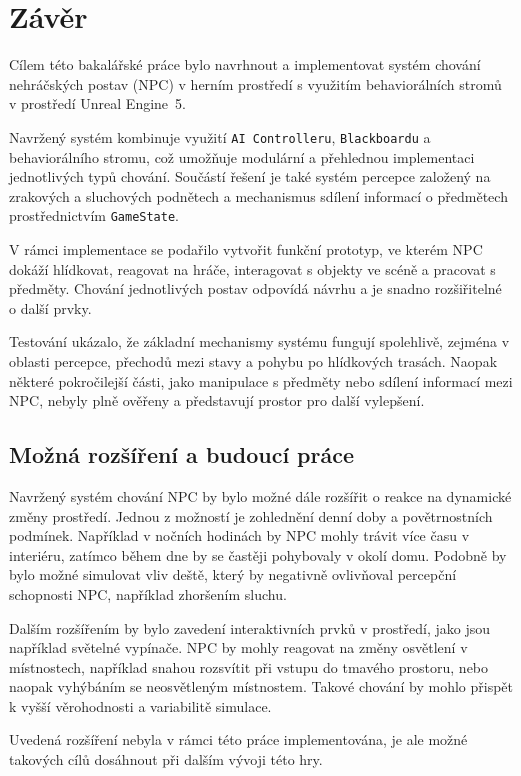 \chapter{Závěr}
\label{sec:conclusion}

Cílem této bakalářské práce bylo navrhnout a implementovat systém
chování nehráčských postav (NPC) v herním prostředí s využitím
behaviorálních stromů v prostředí Unreal Engine~5.

Navržený systém kombinuje využití \texttt{AI Controlleru}, \texttt{Blackboardu} a behaviorálního stromu, což umožňuje
modulární a přehlednou implementaci jednotlivých typů chování.
Součástí řešení je také systém percepce založený na zrakových a sluchových podnětech a mechanismus sdílení informací o předmětech 
prostřednictvím \texttt{GameState}.

V rámci implementace se podařilo vytvořit funkční prototyp, ve kterém NPC dokáží hlídkovat, reagovat na hráče, interagovat 
s objekty ve scéně a pracovat s předměty.
Chování jednotlivých postav odpovídá návrhu a je snadno rozšiřitelné o další prvky.

Testování ukázalo, že základní mechanismy systému fungují spolehlivě, zejména v oblasti percepce, přechodů mezi stavy a pohybu po hlídkových trasách. 
Naopak některé pokročilejší části, jako manipulace s předměty nebo sdílení informací mezi NPC, nebyly plně ověřeny a představují prostor pro další vylepšení.

\section{Možná rozšíření a budoucí práce}

Navržený systém chování NPC by bylo možné dále rozšířit o reakce na dynamické změny prostředí. 
Jednou z možností je zohlednění denní doby a povětrnostních podmínek.
Například v nočních hodinách by NPC mohly trávit více času v interiéru, zatímco během dne by se častěji pohybovaly v okolí domu. 
Podobně by bylo možné simulovat vliv deště, který by negativně ovlivňoval percepční schopnosti NPC, například zhoršením sluchu.

Dalším rozšířením by bylo zavedení interaktivních prvků v prostředí, jako jsou například světelné vypínače.
NPC by mohly reagovat na změny osvětlení v místnostech, například snahou rozsvítit při vstupu do tmavého prostoru, nebo naopak vyhýbáním se neosvětleným místnostem.
Takové chování by mohlo přispět k vyšší věrohodnosti a variabilitě simulace.

Uvedená rozšíření nebyla v rámci této práce implementována, je ale možné takových cílů dosáhnout při dalším vývoji této hry.

\endinput